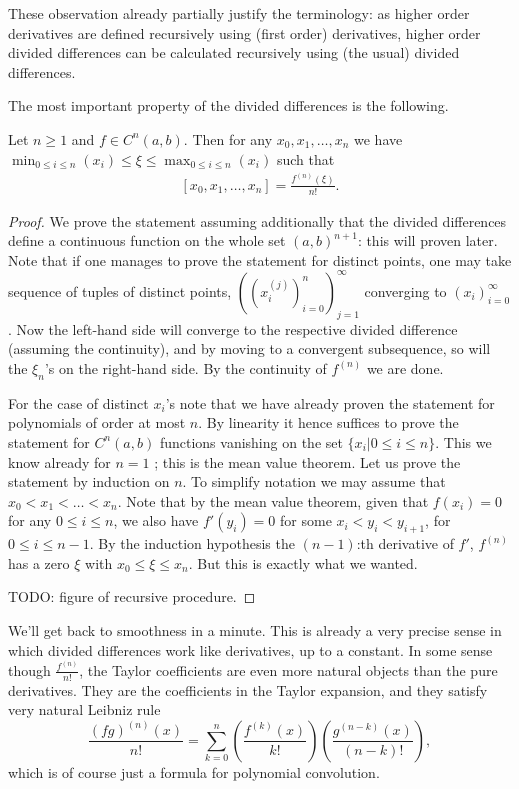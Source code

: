 These observation already partially justify the terminology: as higher order derivatives are defined recursively using (first order) derivatives, higher order divided differences can be calculated recursively using (the usual) divided differences.

The most important property of the divided differences is the following.

\begin{lause}
	Let $n \geq 1$ and $f \in C^{n}(a, b)$. Then for any $x_{0}, x_{1}, \ldots, x_{n}$ we have $\min_{0 \leq i \leq n}(x_{i}) \leq \xi \leq \max_{0 \leq i \leq n}(x_{i})$ such that
	\begin{align}\label{mean_value}
		[x_{0}, x_{1}, \ldots, x_{n}] = \frac{f^{(n)}(\xi)}{n!}.
	\end{align}
\end{lause}
\begin{proof}
	We prove the statement assuming additionally that the divided differences define a continuous function on the whole set $(a, b)^{n + 1}$: this will proven later. Note that if one manages to prove the statement for distinct points, one may take sequence of tuples of distinct points, $((x_{i}^{(j)})_{i = 0}^{n})_{j = 1}^{\infty}$ converging to $(x_{i})_{i = 0}^{\infty}$. Now the left-hand side will converge to the respective divided difference (assuming the continuity), and by moving to a convergent subsequence, so will the $\xi_{n}$'s on the right-hand side. By the continuity of $f^{(n)}$ we are done.

	For the case of distinct $x_{i}$'s note that we have already proven the statement for polynomials of order at most $n$. By linearity it hence suffices to prove the statement for $C^{n}(a, b)$ functions vanishing on the set $\{x_{i} | 0 \leq i \leq n\}$. This we know already for $n = 1$ ; this is the mean value theorem. Let us prove the statement by induction on $n$. To simplify notation we may assume that $x_{0} < x_{1} < \ldots < x_{n}$. Note that by the mean value theorem, given that $f(x_{i}) = 0$ for any $0 \leq i \leq n$, we also have $f'(y_{i}) = 0$ for some $x_{i} < y_{i} < y_{i + 1}$, for $0 \leq i \leq n - 1$. By the induction hypothesis the $(n - 1)$:th derivative of $f'$, $f^{(n)}$ has a zero $\xi$ with $x_{0} \leq \xi \leq x_{n}$. But this is exactly what we wanted.

	TODO: figure of recursive procedure.
\end{proof}

We'll get back to smoothness in a minute. This is already a very precise sense in which divided differences work like derivatives, up to a constant. In some sense though $\frac{f^{(n)}}{n!}$, the Taylor coefficients are even more natural objects than the pure derivatives. They are the coefficients in the Taylor expansion, and they satisfy very natural Leibniz rule
\[
	\frac{(f g)^{(n)}(x)}{n!} = \sum_{k = 0}^{n} \left(\frac{f^{(k)}(x)}{k!}\right)\left(\frac{g^{(n - k)}(x)}{(n - k)!}\right),
\]
which is of course just a formula for polynomial convolution.

